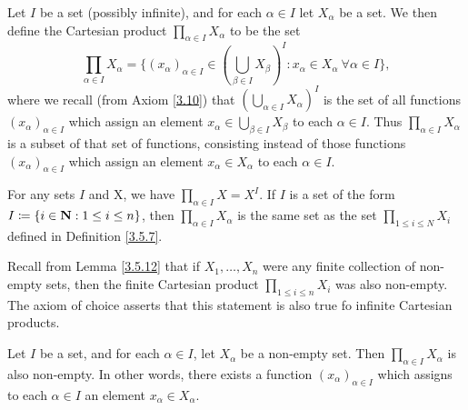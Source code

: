 \begin{definition}\label{8.4.1}
    Let \(I\) be a set (possibly infinite), and for each \(\alpha \in I\) let \(X_{\alpha}\) be a set.
    We then define the Cartesian product \(\prod_{\alpha \in I} X_{\alpha}\) to be the set
    \[
        \prod_{\alpha \in I} X_{\alpha} = \Bigg\{(x_{\alpha})_{\alpha \in I} \in (\bigcup_{\beta \in I} X_{\beta})^I : x_{\alpha} \in X_{\alpha} \ \forall \alpha \in I\Bigg\},
    \]
    where we recall (from Axiom \ref{3.10}) that \((\bigcup_{\alpha \in I} X_{\alpha})^I\) is the set of all functions \((x_{\alpha})_{\alpha \in I}\) which assign an element \(x_{\alpha} \in \bigcup_{\beta \in I} X_{\beta}\) to each \(\alpha \in I\).
    Thus \(\prod_{\alpha \in I} X_{\alpha}\) is a subset of that set of functions, consisting instead of those functions \((x_{\alpha})_{\alpha \in I}\) which assign an element \(x_{\alpha} \in X_{\alpha}\) to each \(\alpha \in I\).
\end{definition}

\begin{example}\label{8.4.2}
    For any sets \(I\) and X, we have \(\prod_{\alpha \in I} X = X^I\).
    If \(I\) is a set of the form \(I \coloneqq \{i \in \mathbf{N} : 1 \leq i \leq n\}\), then \(\prod_{\alpha \in I} X_{\alpha}\) is the same set as the set \(\prod_{1 \leq i \leq N} X_i\) defined in Definition \ref{3.5.7}.
\end{example}

\begin{note}
    Recall from Lemma \ref{3.5.12} that if \(X_1, \dots, X_n\) were any finite collection of non-empty sets, then the finite Cartesian product \(\prod_{1 \leq i \leq n} X_i\) was also non-empty.
    The axiom of choice asserts that this statement is also true fo infinite Cartesian products.
\end{note}

\begin{axiom}[Choice]\label{8.1}
    Let \(I\) be a set, and for each \(\alpha \in I\), let \(X_{\alpha}\) be a non-empty set.
    Then \(\prod_{\alpha \in I} X_{\alpha}\) is also non-empty.
    In other words, there exists a function \((x_{\alpha})_{\alpha \in I}\) which assigns to each \(\alpha \in I\) an element \(x_{\alpha} \in X_{\alpha}\).
\end{axiom}

